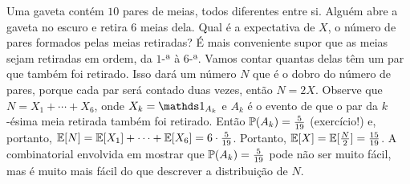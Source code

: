 \begin{example}
Uma gaveta contém $10$ pares de meias, todos diferentes entre si.
Alguém abre a gaveta no escuro e retira $6$ meias dela.
Qual é a expectativa de $X$, o número de pares formados pelas meias retiradas?
É mais conveniente supor que as meias sejam retiradas em ordem, da $1$-ª à $6$-ª.
Vamos contar quantas delas têm um par que também foi retirado.
Isso dará um número $N$ que é o dobro do número de pares, porque cada par será contado duas vezes, então $N = 2X$.
Observe que $N = X_1 + \cdots + X_6$, onde $X_k = \I_{A_k}$ e $A_k$ é o evento de que o par da $k$-ésima meia retirada também foi retirado.
Então $ \mathbb{P}(A_k) = \frac{5}{19} $ (exercício!) e, portanto, $ \mathbb{E}[N] = \mathbb{E}[X_1]+\dots+\mathbb{E}[X_6] = 6 \cdot \frac{5}{19}$.
Portanto, $ \mathbb{E}[X] = \mathbb{E}[\frac{N}{2}] = \frac{15}{19} $.
A combinatorial envolvida em mostrar que $ \mathbb{P}(A_k)=\frac{5}{19} $ pode não ser muito fácil, mas é muito mais fácil do que descrever a distribuição de $N$.
\end{example}

